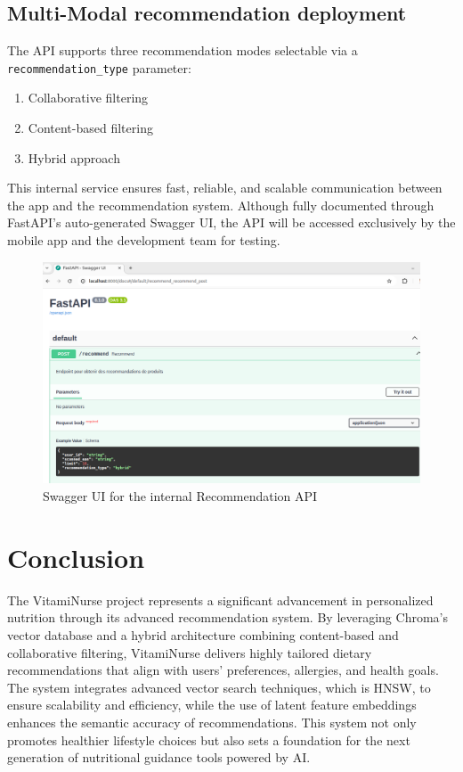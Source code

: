 \subsection{Multi-Modal recommendation deployment}
The API supports three recommendation modes selectable via a \texttt{recommendation\_type} parameter: 
\begin{enumerate}
    \item Collaborative filtering
    \item Content-based filtering
    \item Hybrid approach
\end{enumerate}

This internal service ensures fast, reliable, and scalable communication between the app and the recommendation system. Although fully documented through FastAPI’s auto-generated Swagger UI, the API will be accessed exclusively by the mobile app and the development team for testing.
 \begin{center}
    \begin{figure}[H]
        \includegraphics[scale=0.35]{images/swaggerFastAPI.png}
    \caption{Swagger UI for the internal Recommendation API} 
    \label{fig:swagger UI}
\end{figure}
\end{center}

\section*{Conclusion}
The VitamiNurse project represents a significant advancement in personalized nutrition through its advanced recommendation system. By leveraging Chroma’s vector database and a hybrid architecture combining content-based and collaborative filtering, VitamiNurse delivers highly tailored dietary recommendations that align with users’ preferences, allergies, and health goals. The system integrates advanced vector search techniques, which is HNSW, to ensure scalability and efficiency, while the use of latent feature embeddings enhances the semantic accuracy of recommendations. This system not only promotes healthier lifestyle choices but also sets a foundation for the next generation of nutritional guidance tools powered by AI.